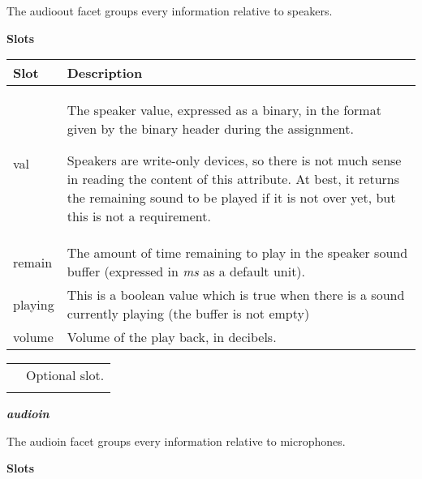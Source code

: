 \documentclass[a4paper]{article}
\begin{document}
{\sffamily
The audioout facet groups every information relative to speakers. }

{\sffamily\bfseries
Slots}

\begin{flushleft}
\tablehead{}
\begin{supertabular}{|m{3.293cm}|m{11.997cm}|}
\hline
{}\sffamily\bfseries Slot &
\sffamily\bfseries Description\\\hline
{} val &
{\sffamily The speaker value, expressed as a
binary, in the format given by the binary header during the
assignment.}

\sffamily Speakers are write-only devices, so
there is not much sense in reading the content of this attribute. At
best, it returns the remaining sound to be played if it is not over
yet, but this is not a requirement.\\\hline
{} remain &
 \textsf{The amount of time remaining to play in
the speaker sound buffer (expressed in }\textsf{\textit{ms}}\textsf{ as
a default unit).}\\\hline
{} playing &
\sffamily This is a boolean value which is true
when there is a sound currently playing (the buffer is not
empty)\\\hline
{} volume &
\sffamily Volume of the play back, in
decibels.\\\hline
\end{supertabular}
\end{flushleft}
\begin{flushleft}
\tablehead{}
\begin{supertabular}{|m{1.717cm}|m{10.464cm}}
\hhline{-~}
 &
 Optional slot.\\\hhline{-~}
\end{supertabular}
\end{flushleft}
{\sffamily\bfseries\itshape
audioin}

{\sffamily
The audioin facet groups every information relative to microphones. }

{\sffamily\bfseries
Slots}
\end{document}
